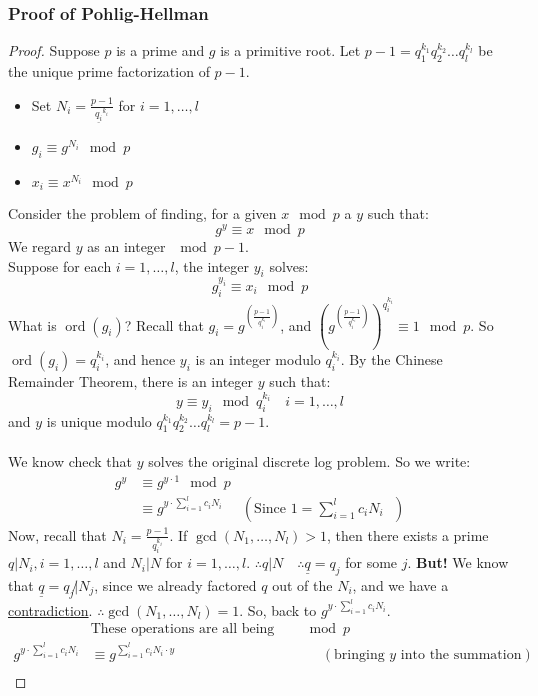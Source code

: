 \documentclass[10pt]{article}
\theoremstyle{definition}
\theoremstyle{remark}
\def\ul{\underline}
\DeclareMathOperator{\ord}{ord}
\begin{document}
\subsubsection{Proof of Pohlig-Hellman}
\begin{proof}
Suppose $p$ is a prime and $g$ is a primitive root.  Let $p-1 = q_1^{k_1}q_2^{k_2}\ldots q_l^{k_l}$ be the unique prime factorization of $p-1$.
\begin{itemize}
\item Set $N_i = \frac{p-1}{\ul{q_i}^{k_i}}$ for $i = 1,\ldots,l$
\item $g_i \equiv g^{N_i} \mod p $
\item $x_i \equiv x^{N_i} \mod p $
\end{itemize}
Consider the problem of finding, for a given $x \mod p$ a $y$ such that: $$g^y \equiv x \mod p$$
We regard $y$ as an integer $\mod p-1$.\\
Suppose for each $i=1,\ldots,l$, the integer $y_i$ solves: $$g_i^{y_i} \equiv x_i \mod p$$
What is $\ord(g_i)$?  Recall that $g_i=g^{(\frac{p-1}{q_i^{k_i}})}$, and $(g^{(\frac{p-1}{q_i^{k_i}})})^{q_i^{k_i}} \equiv 1 \mod p$. So $\ord(g_i)=q_i^{k_i}$, and hence $y_i$ is an integer modulo $q_i^{k_i}$.  By the Chinese Remainder Theorem, there is an integer $y$ such that: $$y \equiv y_i \mod q_i^{k_i} \quad i = 1,\ldots,l$$
and $y$ is unique modulo $q_1^{k_1}q_2^{k_2}\ldots q_l^{k_l} = p-1$.\\
\\
We know check that $y$ solves the original discrete log problem.  So we write:
\begin{align*}
g^y &\equiv g^{y \cdot 1} \mod p \\
&\equiv g^{y \cdot \sum_{i=1}^{l}c_iN_i} &(\text{Since $1 = \sum_{i=1}^{l}c_iN_i$ })
\end{align*}
Now, recall that $N_i = \frac{p-1}{q_i^{k_i}}$.  If $\gcd(N_1,\ldots,N_l) > 1$, then there exists a prime $q|N_i, i = 1,\ldots,l$ and $N_i|N$ for $i = 1,\ldots,l$. $\therefore q|N \quad \therefore \ul{q}=q_j$ for some $j$.
\textbf{But!} We know that $\ul{q}=q_j \not | N_j$, since we already factored $q$ out of the $N_i$, and we have a \ul{contradiction}.  $\therefore \gcd(N_1,\ldots,N_l) = 1$.  So, back to $ g^{y \cdot \sum_{i=1}^{l}c_iN_i}$.\\
\begin{align*}
&\text{These operations are all being performed $\mod p$}&\\
g^{y \cdot \sum_{i=1}^{l}c_iN_i} & \equiv  g^{\sum_{i=1}^{l}c_iN_i \cdot y} &&(\text{bringing $y$ into the summation})\\

\end{align*}
\end{proof}
\end{document}

